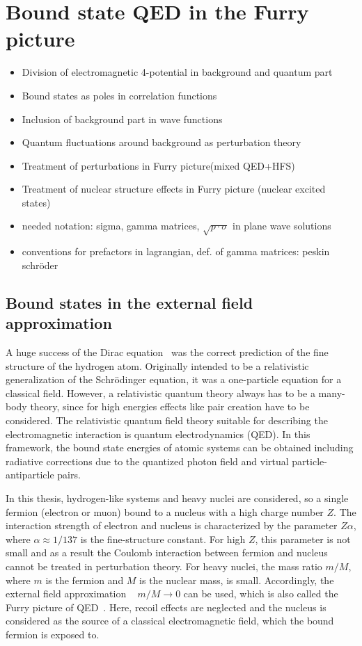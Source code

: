 \chapter{Bound state QED in the Furry picture}
\label{ch:furry_pic}
\begin{itemize}
\item Division of electromagnetic 4-potential in background and quantum part
\item Bound states as poles in correlation functions
\item Inclusion of background part in wave functions
\item Quantum fluctuations around background as perturbation theory
\item Treatment of perturbations in Furry picture(mixed QED+HFS)
\item Treatment of nuclear structure effects in Furry picture (nuclear excited states)
\item needed notation: sigma, gamma matrices, $\sqrt{p\cdot \sigma}$ in plane wave solutions
\item conventions for prefactors in lagrangian, def. of gamma matrices: peskin schröder
\end{itemize} 
\section{Bound states in the external field approximation}
A huge success of the Dirac equation~\cite{dirac1928} was the correct prediction of the fine structure of the hydrogen atom. Originally intended to be a relativistic generalization of the Schrödinger equation, it was a one-particle equation for a classical field. 
However, a relativistic quantum theory always has to be a many-body theory, since for high energies effects like pair creation have to be considered. The relativistic quantum field theory suitable for describing the electromagnetic interaction is quantum electrodynamics (QED). In this framework, the bound state energies of atomic systems can be obtained including radiative corrections due to the quantized photon field and virtual particle-antiparticle pairs. 

In this thesis, hydrogen-like systems and heavy nuclei are considered, so a single fermion (electron or muon) bound to a nucleus with a high charge number $Z$. The interaction strength of electron and nucleus is characterized by the parameter $Z\alpha$, where $\alpha \approx 1/137$ is the fine-structure constant. For high $Z$, this parameter is not small and as a result the Coulomb interaction between fermion and nucleus cannot be treated in perturbation theory. 
For heavy nuclei, the mass ratio $m/M$, where $m$ is the fermion and $M$ is the nuclear mass, is small. Accordingly, the external field approximation ~\cite[\mbox{Section~13.6}]{weinberg2005} $m/M \rightarrow 0$ can be used, which is also called the Furry picture of QED~\cite{furry1951}. Here, recoil effects are neglected and the nucleus is considered as the source of a classical electromagnetic field, which the bound fermion is exposed to.

